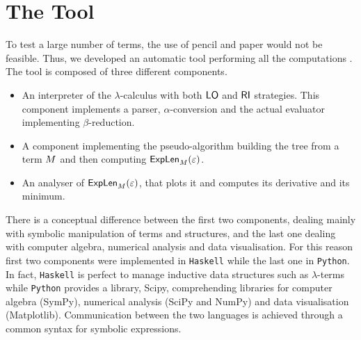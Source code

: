 \section{The Tool}
To test a large number of terms, the use of pencil and paper would not be feasible. Thus, we developed an automatic tool performing all the computations \cite{vanoni_prostra-tool_nodate}. The tool is composed of three different components.
\begin{itemize}
	\item An interpreter of the $\lambda$-calculus with both $\textsf{LO}$ and $\textsf{RI}$ strategies. This component implements a parser, $\alpha$-conversion and the actual evaluator implementing $\beta$-reduction.
	\item A component implementing the pseudo-algorithm building the tree from a term $M$ and then computing $\textsf{ExpLen}_{M}(\varepsilon)$.
	\item An analyser of $\textsf{ExpLen}_{M}(\varepsilon)$, that plots it and computes its derivative and its minimum. 
\end{itemize}
There is a conceptual difference between the first two components, dealing mainly with symbolic manipulation of terms and structures, and the last one dealing with computer algebra, numerical analysis and data visualisation. For this reason first two components were implemented in \texttt{Haskell} while the last one in \texttt{Python}. In fact, \texttt{Haskell} is perfect to manage inductive data structures such as $\lambda$-terms while \texttt{Python} provides a library, \textsf{Scipy}, comprehending libraries for computer algebra (\textsf{SymPy}), numerical analysis (\textsf{SciPy} and \textsf{NumPy}) and data visualisation (\textsf{Matplotlib}). Communication between the two languages is achieved through a common syntax for symbolic expressions.
